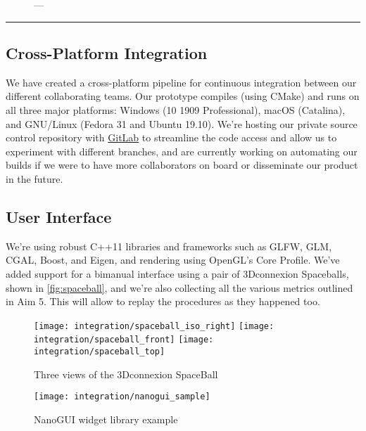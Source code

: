 \begin{figure}
  \centering%
	\caption{---}
	\label{fig:stereo}
\end{figure}

\hrule%

\subsection{Cross-Platform Integration}
\label{ssec:cross}
We have created a cross-platform pipeline for continuous integration between our different collaborating teams. Our prototype compiles (using CMake) and runs on all three major platforms: Windows (10 1909 Professional), macOS (Catalina), and GNU/Linux (Fedora 31 and Ubuntu 19.10). We're hosting our private source control repository with \href{https://gitlab.com}{GitLab} to streamline the code access and allow us to experiment with different branches, and are currently working on automating our builds if we were to have more collaborators on board or disseminate our product in the future.

\subsection{User Interface}
\label{ssec:console}
We're using robust C++11 libraries and frameworks such as GLFW, GLM, CGAL, Boost, and Eigen, and rendering using OpenGL's Core Profile. We've added support for a bimanual interface using a pair of 3Dconnexion Spaceballs, shown in \autoref{fig:spaceball}, and we're also collecting all the various metrics outlined in Aim 5. This will allow to replay the procedures as they happened too.

\begin{figure}
  \centering%
  \texttt{[image: integration/spaceball\_iso\_right]}
  \hfill%
  \texttt{[image: integration/spaceball\_front]}
  \hfill%
  \texttt{[image: integration/spaceball\_top]}
  \caption{Three views of the 3Dconnexion SpaceBall}
  \label{fig:spaceball}
\end{figure}

\begin{figure}
  \centering%
  \texttt{[image: integration/nanogui\_sample]}
  \caption{NanoGUI widget library example}
  \label{fig:nanogui}
\end{figure}

